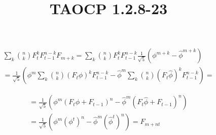 \documentclass{article}
\title{TAOCP 1.2.8\mbox{-}23}
\begin{document}
\maketitle

\begin{multline*}
\sum_{k}\binom{n}{k}F_{t}^{k}F_{t-1}^{n-k}F_{m+k} = \sum_{k}\binom{n}{k}F_{t}^{k}F_{t-1}^{n-k}\frac{1}{\sqrt{5}}(\phi^{m+k} - \hat{\phi}^{m+k}) \\
= \frac{1}{\sqrt{5}}(\phi^{m}\sum_{k}\binom{n}{k}{(F_{t}\phi)}^{k}F_{t-1}^{n-k}-\hat{\phi}^{m}\sum_{k}\binom{n}{k}{(F_{t}\hat{\phi})}^{k}F_{t-1}^{n-k}) =
\end{multline*}

\begin{multline*}
= \frac{1}{\sqrt{5}}(\phi^{m}{(F_{t}\phi+F_{t-1})}^{n} - \hat{\phi}^{m}{(F_{t}\hat{\phi} + F_{t-1})}^{n}) \\
= \frac{1}{\sqrt{5}}(\phi^{m}{(\phi^{t})}^{n} - \hat{\phi}^{m}{(\hat{\phi}^{t})}^{n}) = F_{m+nt}
\end{multline*}
\end{document}

